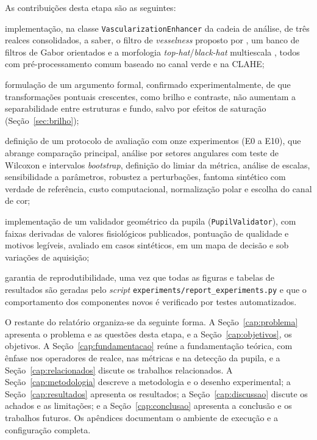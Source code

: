 \documentclass[12pt, oneside, a4paper, chapter=TITLE, section=TITLE,
               english, brazil]{abntex2}
\newcommand{\bh}{\emph{black-hat}}
\newcommand{\tht}{\emph{top-hat}}
\newcommand{\ves}{\emph{vesselness}}
\newcommand{\arq}[1]{\nolinkurl{#1}}
\begin{document}
As contribuições desta etapa são as seguintes:
\begin{alineas}
  \item implementação, na classe \texttt{VascularizationEnhancer} da cadeia
  de análise, de três realces consolidados, a saber, o filtro de \ves{}
  proposto por \citet{Frangi1998}, um banco de filtros de Gabor orientados
  \citep*{Daugman1985,Jain1991} e a morfologia \tht{}/\bh{} multiescala
  \citep*{Soille2004}, todos com pré-processamento comum baseado no canal
  verde e na CLAHE;
  \item formulação de um argumento formal, confirmado experimentalmente, de
  que transformações pontuais crescentes, como brilho e contraste, não
  aumentam a separabilidade entre estruturas e fundo, salvo por efeitos de
  saturação (Seção~\ref{sec:brilho});
  \item definição de um protocolo de avaliação com onze experimentos (E0 a
  E10), que abrange comparação principal, análise por setores angulares com
  teste de Wilcoxon e intervalos \emph{bootstrap}, definição do limiar da
  métrica, análise de escalas, sensibilidade a parâmetros, robustez a
  perturbações, fantoma sintético com verdade de referência, custo
  computacional, normalização polar e escolha do canal de cor;
  \item implementação de um validador geométrico da pupila
  (\texttt{PupilValidator}), com faixas derivadas de valores fisiológicos
  publicados, pontuação de qualidade e motivos legíveis, avaliado em casos
  sintéticos, em um mapa de decisão e sob variações de aquisição;
  \item garantia de reprodutibilidade, uma vez que todas as figuras e tabelas
  de resultados são geradas pelo \emph{script}
  \arq{experiments/report_experiments.py} e que o comportamento dos
  componentes novos é verificado por testes automatizados.
\end{alineas}

O restante do relatório organiza-se da seguinte forma. A
Seção~\ref{cap:problema} apresenta o problema e as questões desta etapa, e a
Seção~\ref{cap:objetivos}, os objetivos. A Seção~\ref{cap:fundamentacao}
reúne a fundamentação teórica, com ênfase nos operadores de realce, nas
métricas e na detecção da pupila, e a Seção~\ref{cap:relacionados} discute os
trabalhos relacionados. A Seção~\ref{cap:metodologia} descreve a metodologia e
o desenho experimental; a Seção~\ref{cap:resultados} apresenta os resultados;
a Seção~\ref{cap:discussao} discute os achados e as limitações; e a
Seção~\ref{cap:conclusao} apresenta a conclusão e os trabalhos futuros. Os
apêndices documentam o ambiente de execução e a configuração completa.
\end{document}
